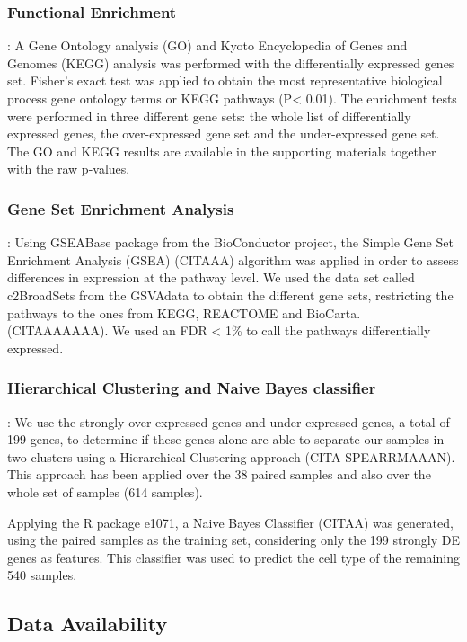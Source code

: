 \documentclass[9pt,twocolumn,twoside]{gsajnl}
\begin{document}
\subsubsection*{Functional Enrichment}
: A Gene Ontology analysis (GO) and Kyoto Encyclopedia of Genes and Genomes (KEGG) analysis was performed with the differentially expressed genes set. Fisher's exact test was applied to obtain the most representative biological process gene ontology terms or KEGG pathways (P< 0.01). The enrichment tests were performed in three different gene sets: the whole list of differentially expressed genes, the over-expressed gene set and the under-expressed gene set. The GO and KEGG results are available in the supporting materials together with the raw p-values.

\subsubsection*{Gene Set Enrichment Analysis}
:  Using GSEABase package from the BioConductor project, the Simple Gene Set Enrichment Analysis (GSEA) (CITAAA) algorithm was applied in order to assess differences in  expression at the pathway level. We used the data set called c2BroadSets from the GSVAdata to obtain the different gene sets, restricting the pathways to the ones from KEGG, REACTOME and BioCarta. (CITAAAAAAA). We used an FDR < 1\% to call the pathways differentially expressed.

\subsubsection*{Hierarchical Clustering and Naive Bayes classifier}
: We use the strongly over-expressed genes and under-expressed genes, a total of 199 genes, to determine if these genes alone are able to separate our samples in two clusters using a Hierarchical Clustering approach (CITA SPEARRMAAAN). This approach has been applied over the 38 paired samples and also over the whole set of samples (614 samples).

Applying the R package e1071, a Naive Bayes Classifier (CITAA) was generated, using the paired samples as the training set, considering only the 199 strongly DE genes as features. This classifier was used to predict the cell type of the remaining 540 samples. 

\subsection*{Data Availability}
\end{document}

